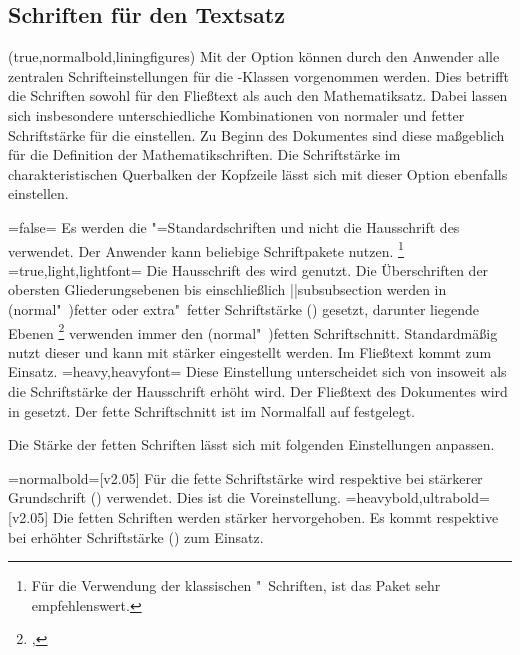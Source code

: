 \begin{DeclareEntity*}{}
\begin{DeclareEntity*}{}
\begin{DeclareEntity*}{}
\subsection{%
  Schriften für den Textsatz%
  \label{sec:text}%
}
%
\begin{Declaration}
  {}
  (true,normalbold,liningfigures)
\printdeclarationlist
%
Mit der Option  können durch den Anwender alle zentralen 
Schrifteinstellungen für die \TUDScript-Klassen vorgenommen werden. Dies 
betrifft die Schriften sowohl für den Fließtext als auch den Mathematiksatz.
Dabei lassen sich insbesondere unterschiedliche Kombinationen von normaler und 
fetter Schriftstärke für die \OpenSans einstellen. Zu Beginn des Dokumentes 
sind diese maßgeblich für die Definition der Mathematikschriften. Die 
Schriftstärke im charakteristischen Querbalken der Kopfzeile lässt sich mit 
dieser Option ebenfalls einstellen.
\begin{DeclareValues}
\itemval=false=
  Es werden die "=Standardschriften und nicht die Hausschrift 
  des \CDs verwendet. Der Anwender kann beliebige Schriftpakete nutzen.%
  \footnote{%
    Für die Verwendung der klassischen "~Schriften, ist das Paket 
     sehr empfehlenswert.%
  }
\itemval*=true,light,lightfont=
  Die Hausschrift \OpenSans des \CDs wird genutzt. Die Überschriften der 
  obersten Gliederungsebenen bis einschließlich \Macro||{subsubsection} 
  werden in (normal"~)fetter oder extra"~fetter Schriftstärke 
  () gesetzt, darunter liegende Ebenen%
  \footnote{, } 
  verwenden immer den (normal"~)fetten Schriftschnitt. Standardmäßig nutzt 
  dieser  und kann mit  
  stärker eingestellt werden. Im Fließtext kommt  zum 
  Einsatz.
\itemval=heavy,heavyfont=
  Diese Einstellung unterscheidet sich von  insoweit als 
  die Schriftstärke der Hausschrift erhöht wird. Der Fließtext des Dokumentes 
  wird in  gesetzt. Der fette Schriftschnitt ist im 
  Normalfall auf  festgelegt.
\end{DeclareValues}

Die Stärke der fetten Schriften lässt sich mit folgenden Einstellungen anpassen.
\begin{DeclareValues}
\itemval=normalbold=[v2.05]
  Für die fette Schriftstärke wird  respektive bei 
  stärkerer Grundschrift () 
  verwendet. Dies ist die Voreinstellung.
\itemval=heavybold,ultrabold=[v2.05]
  Die fetten Schriften werden stärker hervorgehoben. Es kommt 
   respektive  bei 
  erhöhter Schriftstärke () zum Einsatz.
\end{DeclareValues}


\end{Declaration}
\end{DeclareEntity*}
\end{DeclareEntity*}
\end{DeclareEntity*}

